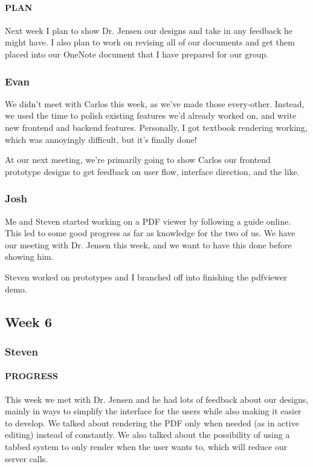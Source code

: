 \documentclass[onecolumn, draftclsnofoot,10pt, compsoc]{IEEEtran}
\begin{document}
	\paragraph{PLAN}
	Next week I plan to show Dr. Jensen our designs and take in any feedback he might have. I also plan to work on revising all of our documents and get them placed into our OneNote document that I have prepared for our group.
	
	
	
	\subsubsection{Evan}
	We didn't meet with Carlos this week, as we've made those every-other. Instead, we used the time to polish existing features we'd already worked on, and write new frontend and backend features. Personally, I got textbook rendering working, which was annoyingly difficult, but it's finally done!
	
	At our next meeting, we're primarily going to show Carlos our frontend prototype designs to get feedback on user flow, interface direction, and the like.
	
	\subsubsection{Josh}
	Me and Steven started working on a PDF viewer by following a guide online. This led to some good progress as far as knowledge for the two of us. We have our meeting with Dr. Jensen this week, and we want to have this done before showing him. 
	
	Steven worked on prototypes and I branched off into finishing the pdfviewer demo. 
\subsection{Week 6}
	\subsubsection{Steven}
	
	\paragraph{PROGRESS}
	This week we met with Dr. Jensen and he had lots of feedback about our designs, mainly in ways to simplify the interface for the users while also making it easier to develop. We talked about rendering the PDF only when needed (as in active editing) instead of constantly. We also talked about the possibility of using a tabbed system to only render when the user wants to, which will reduce our server calls.
	
\end{document}
